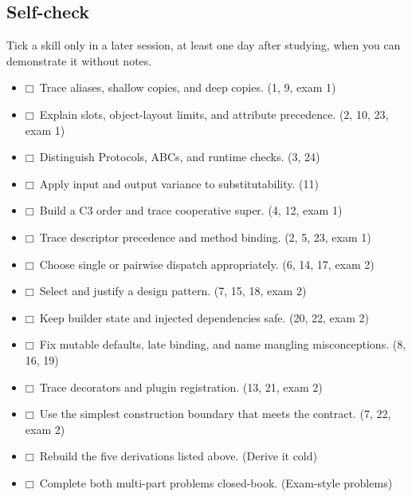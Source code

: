 \documentclass[11pt]{article}
\begin{document}
\begin{keepsection}
\section{Self-check}

Tick a skill only in a later session, at least one day after studying, when you can demonstrate it without notes.

\begin{itemize}
\item $\mdlgwhtsquare$\ Trace aliases, shallow copies, and deep copies. (1, 9, exam 1)
\item $\mdlgwhtsquare$\ Explain slots, object-layout limits, and attribute precedence. (2, 10, 23, exam 1)
\item $\mdlgwhtsquare$\ Distinguish Protocols, ABCs, and runtime checks. (3, 24)
\item $\mdlgwhtsquare$\ Apply input and output variance to substitutability. (11)
\item $\mdlgwhtsquare$\ Build a C3 order and trace cooperative super. (4, 12, exam 1)
\item $\mdlgwhtsquare$\ Trace descriptor precedence and method binding. (2, 5, 23, exam 1)
\item $\mdlgwhtsquare$\ Choose single or pairwise dispatch appropriately. (6, 14, 17, exam 2)
\item $\mdlgwhtsquare$\ Select and justify a design pattern. (7, 15, 18, exam 2)
\item $\mdlgwhtsquare$\ Keep builder state and injected dependencies safe. (20, 22, exam 2)
\item $\mdlgwhtsquare$\ Fix mutable defaults, late binding, and name mangling misconceptions. (8, 16, 19)
\item $\mdlgwhtsquare$\ Trace decorators and plugin registration. (13, 21, exam 2)
\item $\mdlgwhtsquare$\ Use the simplest construction boundary that meets the contract. (7, 22, exam 2)
\item $\mdlgwhtsquare$\ Rebuild the five derivations listed above. (Derive it cold)
\item $\mdlgwhtsquare$\ Complete both multi-part problems closed-book. (Exam-style problems)
\end{itemize}
\end{keepsection}


\clearpage
\end{document}
